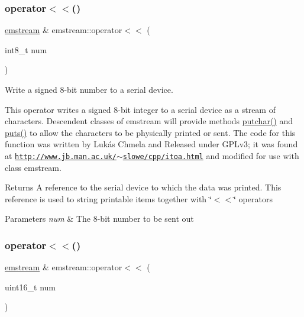 \subsubsection{\texorpdfstring{operator$<$$<$()}{operator<<()}\hspace{0.1cm}{\footnotesize\ttfamily [4/14]}}
{\footnotesize\ttfamily \mbox{\hyperlink{classemstream}{emstream}} \& emstream\+::operator$<$$<$ (\begin{DoxyParamCaption}\item[{int8\+\_\+t}]{num }\end{DoxyParamCaption})}



Write a signed 8-\/bit number to a serial device. 

This operator writes a signed 8-\/bit integer to a serial device as a stream of characters. Descendent classes of {\ttfamily emstream} will provide methods {\ttfamily \mbox{\hyperlink{classemstream_aa4dffc9aa58f601cc4153b4cbe65d757}{putchar()}}} and {\ttfamily \mbox{\hyperlink{classemstream_a1ad530cbebe6c54640c1db8c1b9afda2}{puts()}}} to allow the characters to be physically printed or sent. The code for this function was written by Lukás Chmela and Released under G\+P\+Lv3; it was found at \href{http://www.jb.man.ac.uk/~slowe/cpp/itoa.html}{\tt http\+://www.\+jb.\+man.\+ac.\+uk/$\sim$slowe/cpp/itoa.\+html} and modified for use with class {\ttfamily emstream}. \begin{DoxyReturn}{Returns}
A reference to the serial device to which the data was printed. This reference is used to string printable items together with \char`\"{}$<$$<$\char`\"{} operators 
\end{DoxyReturn}

\begin{DoxyParams}{Parameters}
{\em num} & The 8-\/bit number to be sent out \\
\hline
\end{DoxyParams}
\mbox{\label{classemstream_aed40605be053b7cbae14201162028781}} 
\subsubsection{\texorpdfstring{operator$<$$<$()}{operator<<()}\hspace{0.1cm}{\footnotesize\ttfamily [5/14]}}
{\footnotesize\ttfamily \mbox{\hyperlink{classemstream}{emstream}} \& emstream\+::operator$<$$<$ (\begin{DoxyParamCaption}\item[{uint16\+\_\+t}]{num }\end{DoxyParamCaption})}



